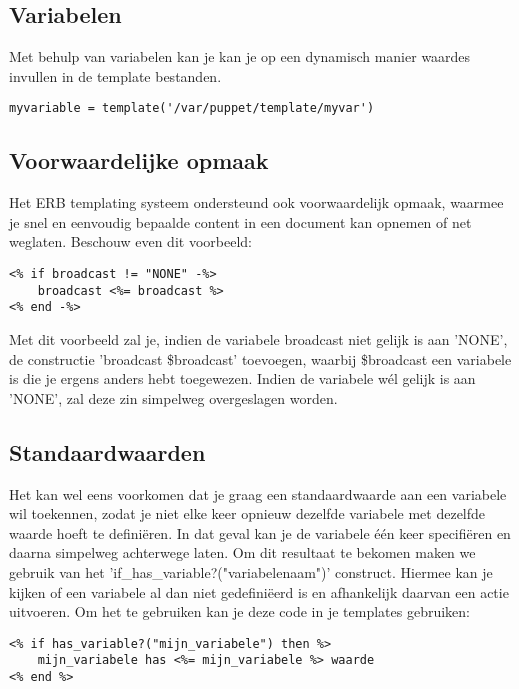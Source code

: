 \subsection{Variabelen}
Met behulp van variabelen kan je kan je op een dynamisch manier waardes invullen in de template bestanden.
\begin{code}
\begin{lstlisting}
myvariable = template('/var/puppet/template/myvar')
\end{lstlisting}
\end{code}
\subsection{Voorwaardelijke opmaak}
Het ERB templating systeem ondersteund ook voorwaardelijk opmaak, waarmee je snel en eenvoudig bepaalde content in een document kan opnemen of net weglaten. Beschouw even dit voorbeeld:
\begin{code}
\begin{lstlisting}
<% if broadcast != "NONE" -%>
	broadcast <%= broadcast %>
<% end -%>
\end{lstlisting}
\end{code}
Met dit voorbeeld zal je, indien de variabele broadcast niet gelijk is aan 'NONE', de constructie 'broadcast \$broadcast' toevoegen, waarbij \$broadcast een variabele is die je ergens anders hebt toegewezen. Indien de variabele w\'{e}l gelijk is aan 'NONE', zal deze zin simpelweg overgeslagen worden.
\subsection{Standaardwaarden}
Het kan wel eens voorkomen dat je graag een standaardwaarde aan een variabele wil toekennen, zodat je niet elke keer opnieuw dezelfde variabele met dezelfde waarde hoeft te defini\"eren. In dat geval kan je de variabele \'e\'en keer specifi\"eren en daarna simpelweg achterwege laten. Om dit resultaat te bekomen maken we gebruik van het 'if\_has\_variable?("variabelenaam")' construct. Hiermee kan je kijken of een variabele al dan niet gedefini\"eerd is en afhankelijk daarvan een actie uitvoeren. Om het te gebruiken kan je deze code in je templates gebruiken:
\begin{code}
\begin{lstlisting}
<% if has_variable?("mijn_variabele") then %>
	mijn_variabele has <%= mijn_variabele %> waarde
<% end %>
\end{lstlisting}
\end{code}
